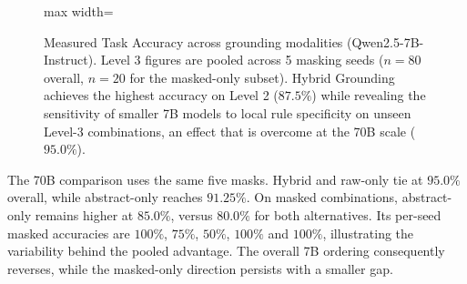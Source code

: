 \documentclass[journal]{IEEEtran}
\theoremstyle{definition}
\theoremstyle{remark}
\begin{document}
\begin{figure}[!t]
    \centering
    \begin{adjustbox}{max width=\linewidth}\end{adjustbox}
    \caption{Measured Task Accuracy across grounding modalities (Qwen2.5-7B-Instruct). Level 3 figures are pooled across 5 masking seeds ($n=80$ overall, $n=20$ for the masked-only subset). Hybrid Grounding achieves the highest accuracy on Level 2 ($87.5\%$) while revealing the sensitivity of smaller 7B models to local rule specificity on unseen Level-3 combinations, an effect that is overcome at the 70B scale ($95.0\%$).}
    \label{fig:exp2_ablation}
\end{figure}

The 70B comparison uses the same five masks. Hybrid and raw-only tie at $95.0\%$ overall, while abstract-only reaches $91.25\%$. On masked combinations, abstract-only remains higher at $85.0\%$, versus $80.0\%$ for both alternatives. Its per-seed masked accuracies are $100\%$, $75\%$, $50\%$, $100\%$ and $100\%$, illustrating the variability behind the pooled advantage. The overall 7B ordering consequently reverses, while the masked-only direction persists with a smaller gap.
\end{document}
